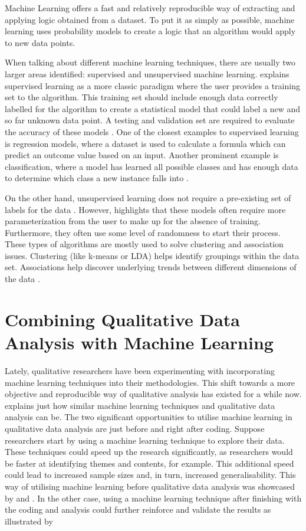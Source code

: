\documentclass{l4proj}
\begin{document}
Machine Learning offers a fast and relatively reproducible way of extracting and applying logic obtained from a dataset. To put it as simply as possible, machine learning uses probability models to create a logic that an algorithm would apply to new data points. 

When talking about different machine learning techniques, there are usually two larger areas identified: supervised and unsupervised machine learning. \cite{janasik2009text} explains supervised learning as a more classic paradigm where the user provides a training set to the algorithm. This training set should include enough data correctly labelled for the algorithm to create a statistical model that could label a new and so far unknown data point. A testing and validation set are required to evaluate the accuracy of these models \citep{leopold2020opposites}. One of the closest examples to supervised learning is regression models, where a dataset is used to calculate a formula which can predict an outcome value based on an input. Another prominent example is classification, where a model has learned all possible classes and has enough data to determine which class a new instance falls into \citep{hindman2015building}.

On the other hand, unsupervised learning does not require a pre-existing set of labels for the data \citep{janasik2009text}. However, \cite{janasik2009text} highlights that these models often require more parameterization from the user to make up for the absence of training. Furthermore, they often use some level of randomness to start their process. These types of algorithms are mostly used to solve clustering and association issues. Clustering (like k-means or LDA) helps identify groupings within the data set. Associations help discover underlying trends between different dimensions of the data \citep{grimmer2021machine}.

\section{Combining Qualitative Data Analysis with Machine Learning}
Lately, qualitative researchers have been experimenting with incorporating machine learning techniques into their methodologies. This shift towards a more objective and reproducible way of qualitative analysis has existed for a while now. \cite{muller2016machine} explains just how similar machine learning techniques and qualitative data analysis can be. The two significant opportunities to utilise machine learning in qualitative data analysis are just before and right after coding. Suppose researchers start by using a machine learning technique to explore their data. These techniques could speed up the research significantly, as researchers would be faster at identifying themes and contents, for example. This additional speed could lead to increased sample sizes and, in turn, increased generalisability. This way of utilising machine learning before qualitative data analysis was showcased by \cite{gauthier2022will} and \cite{delgosha2022discovering}. In the other case, using a machine learning technique after finishing with the coding and analysis could further reinforce and validate the results as illustrated by \cite{gonzalez2022using}
\end{document}
